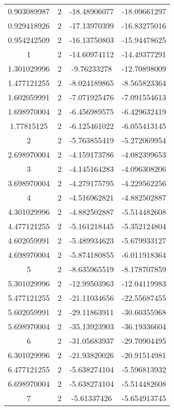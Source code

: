 \documentclass[a4paper, 12pt]{extarticle}
\begin{document}
\begin{longtable}{cccc}
    0.903089987 & 2     & -18.48906077 & -18.09661297 \\
    0.929418926 & 2     & -17.13970399 & -16.83275016 \\
    0.954242509 & 2     & -16.13750803 & -15.94478625 \\
    1     & 2     & -14.60974112 & -14.49377291 \\
    1.301029996 & 2     & -9.76233278 & -12.70898009 \\
    1.477121255 & 2     & -8.024189865 & -8.565823364 \\
    1.602059991 & 2     & -7.071925476 & -7.091554613 \\
    1.698970004 & 2     & -6.456989575 & -6.429632419 \\
    1.77815125 & 2     & -6.125461022 & -6.055413145 \\
    2     & 2     & -5.763855419 & -5.272069954 \\
    2.698970004 & 2     & -4.159173786 & -4.082399653 \\
    3     & 2     & -4.145164283 & -4.096308206 \\
    3.698970004 & 2     & -4.279175795 & -4.229562256 \\
    4     & 2     & -4.516962821 & -4.882502887 \\
    4.301029996 & 2     & -4.882502887 & -5.514482608 \\
    4.477121255 & 2     & -5.161218445 & -5.352124804 \\
    4.602059991 & 2     & -5.489934623 & -5.679933127 \\
    4.698970004 & 2     & -5.874180855 & -6.011918364 \\
    5     & 2     & -8.635965519 & -8.178707859 \\
    5.301029996 & 2     & -12.99503963 & -12.04119983 \\
    5.477121255 & 2     & -21.11034656 & -22.55687455 \\
    5.602059991 & 2     & -29.11863911 & -30.60355968 \\
    5.698970004 & 2     & -35.13923903 & -36.19336604 \\
    6     & 2     & -31.05683937 & -29.70904495 \\
    6.301029996 & 2     & -21.93820026 & -20.91514981 \\
    6.477121255 & 2     & -5.638274104 & -5.596813932 \\
    6.698970004 & 2     & -5.638274104 & -5.514482608 \\
    7     & 2     & -5.61337426 & -5.654913745 \\

\end{longtable}
\end{document}
